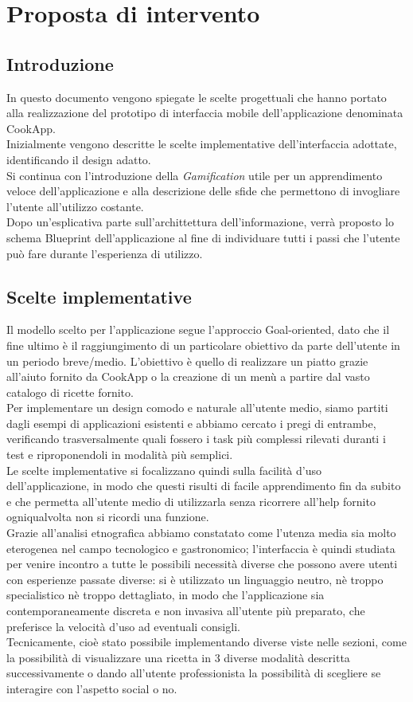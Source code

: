 \section{Proposta di intervento}
\subsection{Introduzione}
In questo documento vengono spiegate le scelte progettuali che hanno portato alla realizzazione del prototipo di interfaccia mobile dell’applicazione denominata CookApp.\\
Inizialmente vengono descritte le scelte implementative dell'interfaccia adottate, identificando il design adatto.\\
Si continua con l'introduzione della \textit{Gamification} utile per un apprendimento veloce dell'applicazione e alla descrizione delle sfide che permettono di invogliare l'utente all'utilizzo costante.\\
Dopo un'esplicativa parte sull'archittettura dell'informazione, verrà proposto lo schema Blueprint dell'applicazione al fine di individuare tutti i passi che l'utente può fare durante l'esperienza di utilizzo.

\subsection{Scelte implementative}
Il modello scelto per l'applicazione segue l'approccio Goal-oriented, dato che il fine ultimo è il raggiungimento di un particolare obiettivo da parte dell'utente in un periodo breve/medio. L'obiettivo è quello di realizzare un piatto grazie all'aiuto fornito da CookApp o la creazione di un menù a partire dal vasto catalogo di ricette fornito.\\
Per implementare un design comodo e naturale all'utente medio, siamo partiti dagli esempi di applicazioni esistenti e abbiamo cercato i pregi di entrambe, verificando trasversalmente quali fossero i task più complessi rilevati duranti i test e riproponendoli in modalità più semplici.\\
Le scelte implementative si focalizzano quindi sulla facilità d'uso dell'applicazione, in modo che questi risulti di facile apprendimento fin da subito e che permetta all'utente medio di utilizzarla senza ricorrere all'help fornito ogniqualvolta non si ricordi una funzione.\\
Grazie all'analisi etnografica abbiamo constatato come l'utenza media sia molto eterogenea nel campo tecnologico e gastronomico; l'interfaccia è quindi studiata per venire incontro a tutte le possibili necessità diverse che possono avere utenti con esperienze passate diverse: si è utilizzato un linguaggio neutro, nè troppo specialistico nè troppo dettagliato, in modo che l'applicazione sia contemporaneamente discreta e non invasiva all'utente più preparato, che preferisce la velocità d'uso ad eventuali consigli.\\
Tecnicamente, cioè stato possibile implementando diverse viste nelle sezioni, come la possibilità di visualizzare una ricetta in 3 diverse modalità descritta successivamente o dando all'utente professionista la possibilità di scegliere se interagire con l'aspetto social o no.


